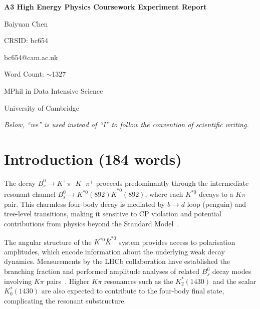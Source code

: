 \documentclass[10pt,leqno]{amsart}
\begin{document}
\begin{titlepage}
\centering
\vspace*{2cm}

{\LARGE \bfseries A3 High Energy Physics Coursework Experiment Report\par}

\vspace{1.5cm}

{\large Baiyuan Chen\par}
\vspace{0.3cm}
{\large CRSID: bc654\par}
\vspace{0.3cm}
{\large bc654@cam.ac.uk\par}

\vspace{1.5cm}

{\large Word Count: $\sim$1327\par}

\vspace{1.5cm}

{\large MPhil in Data Intensive Science\par}
\vspace{0.3cm}
{\large University of Cambridge\par}
\vspace{1.5cm}

{\small\textit{Below, ``we'' is used instead of ``I'' to follow the convention of scientific writing.}\par}

\vfill
\end{titlepage}

\section{Introduction (184 words)}

The decay $B_s^0 \to K^+\pi^-K^-\pi^+$ proceeds predominantly through the intermediate resonant channel $B_s^0 \to K^{*0}(892)\bar{K}^{*0}(892)$, where each $K^{*0}$ decays to a $K\pi$ pair. This charmless four-body decay is mediated by $b \to d$ loop (penguin) and tree-level transitions, making it sensitive to CP violation and potential contributions from physics beyond the Standard Model~\cite{lhcb_kskpi}.

The angular structure of the $K^{*0}\bar{K}^{*0}$ system provides access to polarisation amplitudes, which encode information about the underlying weak decay dynamics. Measurements by the LHCb collaboration have established the branching fraction and performed amplitude analyses of related $B_s^0$ decay modes involving $K\pi$ pairs~\cite{lhcb_kskpi}. Higher $K\pi$ resonances such as the $K_2^*(1430)$ and the scalar $K_0^*(1430)$ are also expected to contribute to the four-body final state, complicating the resonant substructure.
\end{document}
